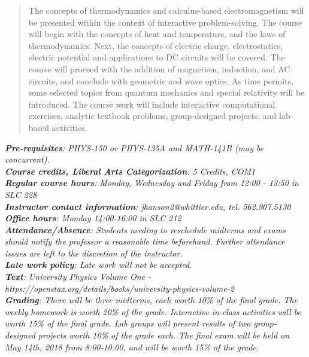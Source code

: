 \documentclass[10pt]{article}
\begin{document}
\maketitle

\begin{abstract}
The concepts of thermodynamics and calculus-based electromagnetism will be presented within the context of interactive problem-solving.  The course will begin with the concepts of heat and temperature, and the laws of thermodynamics.  Next, the concepts of electric charge, electrostatics, electric potential and applications to DC circuits will be covered.  The course will proceed with the addition of magnetism, induction, and AC circuits, and conclude with geometric and wave optics.  As time permits, some selected topics from quantum mechanics and special relativity will be introduced.  The course work will include interactive computational exercises, analytic textbook problems, group-designed projects, and lab-based activities.
\end{abstract}
\noindent
\textit{\textbf{Pre-requisites}: PHYS-150 or PHYS-135A and MATH-141B (may be concurrent).} \\
\textit{\textbf{Course credits, Liberal Arts Categorization}: 5 Credits, COM1} \\
\textit{\textbf{Regular course hours}: Monday, Wednesday and Friday from 12:00 - 13:50 in SLC 228} \\
\textit{\textbf{Instructor contact information}: jhanson2@whittier.edu, tel. 562.907.5130} \\
\textit{\textbf{Office hours}: Monday 14:00-16:00 in SLC 212} \\
\textit{\textbf{Attendance/Absence}: Students needing to reschedule midterms and exams should notify the professor a reasonable time beforehand. Further attendance issues are left to the discretion of the instructor}.\\ 
\textit{\textbf{Late work policy}: Late work will not be accepted.} \\
\textit{\textbf{Text}: University Physics Volume One - https://openstax.org/details/books/university-physics-volume-2} \\
\textit{\textbf{Grading}: There will be three midterms, each worth 10\% of the final grade.  The weekly homework is worth 20\% of the grade.  Interactive in-class activities will be worth 15\% of the final grade.  Lab groups will present results of two group-designed projects worth 10\% of the grade each.  The final exam will be held on May 14th, 2018 from 8:00-10:00, and will be worth 15\% of the grade.} \\
\end{document}
